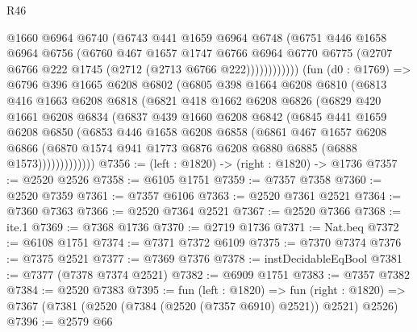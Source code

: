 \begin{lexlean}{R46}
\begin{coremodule}
                    @1660
                    @6964
                    @6740
                    (@6743
                      @441
                      @1659
                      @6964
                      @6748
                      (@6751
                        @446
                        @1658
                        @6964
                        @6756
                        (@6760
                          @467
                          @1657
                          @1747
                          @6766
                          @6964
                          @6770
                          @6775
                          (@2707 @6766 @222 @1745 (@2712 (@2713 @6766 @222))))))))))))
        (fun (d0 : @1769) =>
        @6796
          @396
          @1665
          @6208
          @6802
          (@6805
            @398
            @1664
            @6208
            @6810
            (@6813
              @416
              @1663
              @6208
              @6818
              (@6821
                @418
                @1662
                @6208
                @6826
                (@6829
                  @420
                  @1661
                  @6208
                  @6834
                  (@6837
                    @439
                    @1660
                    @6208
                    @6842
                    (@6845
                      @441
                      @1659
                      @6208
                      @6850
                      (@6853
                        @446
                        @1658
                        @6208
                        @6858
                        (@6861
                          @467
                          @1657
                          @6208
                          @6866
                          (@6870 @1574 @941 @1773 @6876 @6208 @6880 @6885 (@6888 @1573)))))))))))))
@7356 := (left : @1820) -> (right : @1820) -> @1736
@7357 := @2520 @2526
@7358 := @6105 @1751
@7359 := @7357 @7358
@7360 := @2520 @7359
@7361 := @7357 @6106
@7363 := @2520 @7361 @2521
@7364 := @7360 @7363
@7366 := @2520 @7364 @2521
@7367 := @2520 @7366
@7368 := ite.{1}
@7369 := @7368 @1736
@7370 := @2719 @1736
@7371 := Nat.beq
@7372 := @6108 @1751
@7374 := @7371 @7372 @6109
@7375 := @7370 @7374
@7376 := @7375 @2521
@7377 := @7369 @7376
@7378 := instDecidableEqBool
@7381 := @7377 (@7378 @7374 @2521)
@7382 := @6909 @1751
@7383 := @7357 @7382
@7384 := @2520 @7383
@7395 := fun (left : @1820) =>
  fun (right : @1820) => @7367 (@7381 (@2520 (@7384 (@2520 (@7357 @6910) @2521)) @2521) @2526)
@7396 := @2579 @66

\end{coremodule}
\end{lexlean}
